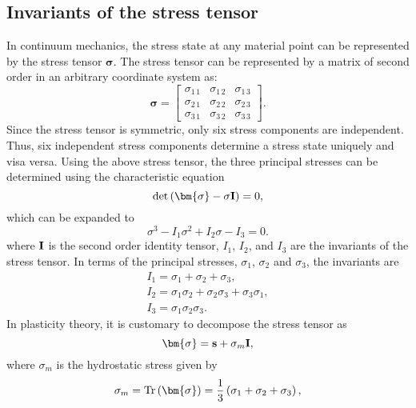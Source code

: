 \subsection{Invariants of the stress tensor}
\noindent
In continuum mechanics, the stress state at any material point can be represented by the stress tensor $\bm{\sigma}$.
The stress tensor can be represented by a matrix of second order in an arbitrary coordinate system as:
\begin{equation}
\bm{\sigma} =
  \begin{bmatrix}
    \sigma_{1\,1}& \sigma_{1\,2}& \sigma_{1\,3}\\
    \sigma_{2\,1}& \sigma_{2\,2}& \sigma_{2\,3}\\
    \sigma_{3\,1}& \sigma_{3\,2}& \sigma_{3\,3}
  \end{bmatrix}.
\end{equation}
Since the stress tensor is symmetric, only six stress components are independent.
Thus, six independent stress components determine a stress state uniquely and visa versa.
Using the above stress tensor, the three principal stresses can be determined using the characteristic equation
\begin{equation}
\det \left( {{\bm{\sigma }} - \sigma {\bf{I}}} \right) = 0,
\end{equation}
which can be expanded to
\begin{equation}
{\sigma ^3} - {I_1}{\sigma ^2} + {I_2}\sigma  - {I_3} = 0.
\end{equation}
where $\bf{I}$ is the second order identity tensor, ${I_1}$, ${I_2}$, and ${I_3}$ are the invariants of the stress tensor.
In terms of the principal stresses, $\sigma_1$, $\sigma_2$ and $\sigma_3$, the invariants are
\begin{equation}
\begin{array}{*{20}{l}}
{{I_1} = {\sigma _1} + {\sigma _2} + {\sigma _3}},\\
{{I_2} = {\sigma _1}{\sigma _2} + {\sigma _2}{\sigma _3} + {\sigma _3}{\sigma _1}},\\
{{I_3} = {\sigma _1}{\sigma _2}{\sigma _3}}.
\end{array}
\end{equation}
In plasticity theory, it is customary to decompose the stress tensor as
\begin{equation}
{\bm{\sigma }} = {\bf{s}} + {\sigma _m}{\bf{I}},
\end{equation}
where $\sigma_m$ is the hydrostatic stress given by
\begin{equation}
{\sigma _m} = {\rm{Tr}}\left( {\bm{\sigma }} \right) = \frac{1}{3}\left( {{\sigma _1} + {\sigma _2} + {\sigma _3}} \right),
\end{equation}
